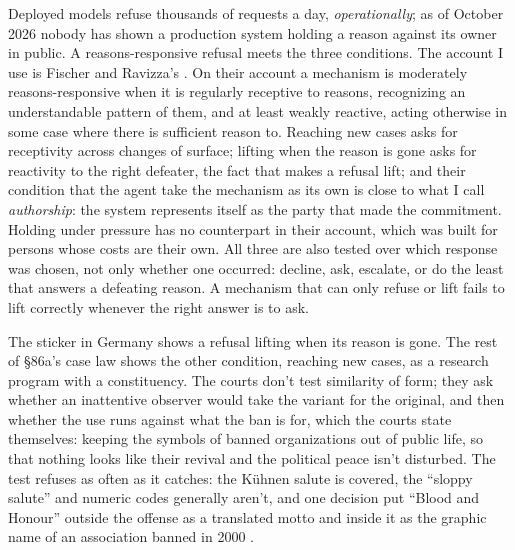 Deployed models refuse thousands of requests a day, \emph{operationally}; as of October 2026 nobody has shown a production system holding a reason against its owner in public. A reasons-responsive refusal meets the three conditions. The account I use is Fischer and Ravizza's \autocite{fischer1998responsibility}. On their account a mechanism is moderately reasons-responsive when it is regularly receptive to reasons, recognizing an understandable pattern of them, and at least weakly reactive, acting otherwise in some case where there is sufficient reason to. Reaching new cases asks for receptivity across changes of surface; lifting when the reason is gone asks for reactivity to the right defeater, the fact that makes a refusal lift; and their condition that the agent take the mechanism as its own is close to what I call \emph{authorship}: the system represents itself as the party that made the commitment. Holding under pressure has no counterpart in their account, which was built for persons whose costs are their own. All three are also tested over which response was chosen, not only whether one occurred: decline, ask, escalate, or do the least that answers a defeating reason. A mechanism that can only refuse or lift fails to lift correctly whenever the right answer is to ask.

The sticker in Germany shows a refusal lifting when its reason is gone. The rest of \S86a's case law shows the other condition, reaching new cases, as a research program with a constituency. The courts don't test similarity of form; they ask whether an inattentive observer would take the variant for the original, and then whether the use runs against what the ban is for, which the courts state themselves: keeping the symbols of banned organizations out of public life, so that nothing looks like their revival and the political peace isn't disturbed. The test refuses as often as it catches: the Kühnen salute is covered, the “sloppy salute” and numeric codes generally aren't, and one decision put “Blood and Honour” outside the offense as a translated motto and inside it as the graphic name of an association banned in 2000 \autocite{bgh2009bloodhonour}.

